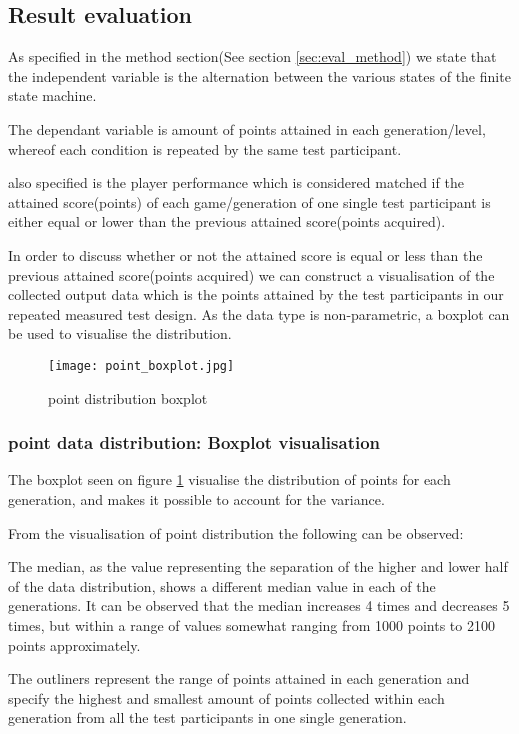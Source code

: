 \newpage
\subsection{Result evaluation} \label{resulteval}

As specified in the method section(See section \ref{sec:eval_method}) we state that the independent variable is the alternation between the various states of the finite state machine.

The dependant variable is amount of points attained in each generation/level, whereof each condition is repeated by the same test participant.

also specified is the player performance which is  considered matched if the attained score(points) of each game/generation of one single test participant is either equal or lower than the previous attained score(points acquired).

In order to discuss whether or not the attained score is equal or less than the previous attained score(points acquired) we can construct a visualisation of the collected output data which is the points attained by the test participants in our repeated measured test design.
As the data type is non-parametric, a boxplot can be used to visualise the distribution.

\begin{figure}[h!]
\centering
\texttt{[image: point\_boxplot.jpg]}
\caption{point distribution boxplot}
\label{fig:boxplot_points}
\end{figure}

\subsubsection{point data distribution: Boxplot visualisation}

The boxplot seen on figure \ref{fig:boxplot_points} visualise the distribution of points for each generation, and makes it possible to account for the variance.

From the visualisation of point distribution the following can be observed:

The median, as the value representing the separation of the higher and lower half of the data distribution, shows a different median value in each of the generations. It can be observed that the median increases 4 times and decreases 5 times, but within a range of values somewhat ranging from 1000 points to 2100 points approximately.

The outliners represent the range of points attained in each generation and specify the highest and smallest amount of points collected within each generation from all the test participants in one single generation.

